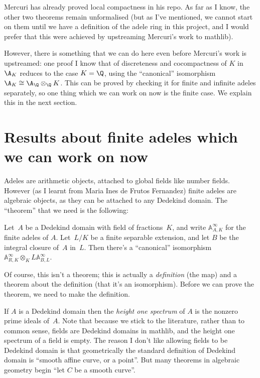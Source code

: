 Mercuri has already proved local compactness in his repo.
As far as I know, the other
two theorems remain unformalised (but as I've mentioned, we cannot start on them until
we have a definition of the adele ring in this project, and I would prefer
that this were achieved by upstreaming Mercuri's work to mathlib).

However, there is something that we can do here even before Mercuri's work
is upstreamed: one proof I know that of discreteness
and cocompactness of $K$ in $\A_K$ reduces to the case $K=\Q$, using the ``canonical''
isomorphism $\A_K\cong\A_{\Q}\otimes_{\Q}K$. This can be proved by checking it for finite
and infinite adeles separately, so one thing which we can work on now is the finite case.
We explain this in the next section.

\section{Results about finite adeles which we can work on now}

Adeles are arithmetic objects, attached to global fields like number fields.
However (as I learnt from Maria Ines de Frutos Fernandez) finite adeles are algebraic
objects, as they can be attached to any Dedekind domain. The ``theorem'' that we need
is the following:

\begin{theorem}
  Let~$A$ be a Dedekind domain with field of fractions~$K$, and write $\mathbb{A}_{A,K}^\infty$
  for the finite adeles of $A$. Let~$L/K$ be a finite
  separable extension, and let $B$ be the integral closure of~$A$ in~$L$.
  Then there's a ``canonical'' isomorphism $\mathbb{A}_{R,K}^\infty \otimes_KL\mathbb{A}_{B,L}^\infty$.
\end{theorem}

Of course, this isn't a theorem; this is actually a \emph{definition} (the map) and a theorem about
the definition (that it's an isomorphism). Before we can prove the theorem, we need to make the
definition.

If $A$ is a Dedekind domain then the \emph{height one spectrum} of $A$ is
the nonzero prime ideals of~$A$. Note that because we stick to the literature,
rather than to common sense, fields are Dedekind domains in mathlib, and the
height one spectrum of a field is empty. The reason I don't like allowing fields
to be Dedekind domain is that geometrically the standard definition of Dedekind
domain is ``smooth affine curve, or a point''. But many theorems in algebraic geometry
begin ``let $C$ be a smooth curve''.

